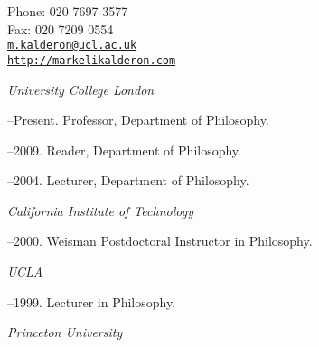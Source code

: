 \documentclass[11pt]{article}
\makeatletter
\def\myemail{m.kalderon@ucl.ac.uk}
\def\myweb{http://markelikalderon.com}
\def\myphone{020 7697 3577}
\def\myfax{020 7209 0554}
\makeatother
\begin{document}
\begin{minipage}[t]{2.95in}
  
\end{minipage}
\hfill     
\hfill
\begin{minipage}[t]{1.7in}
  \flushright \footnotesize Phone: \myphone \\ 
  Fax: \myfax  \\ 
  {\scriptsize  \texttt{\href{mailto:\myemail}{\myemail}}} \\
  {\scriptsize  \texttt{\href{\myweb}{\myweb}}}
\end{minipage}


\medskip

\reversemarginpar

\medskip       

\medskip
{}

\noindent\emph{University College London \vspace{0.01in}}

--Present. Professor, Department of Philosophy.      

--2009. Reader, Department of Philosophy.

--2004. Lecturer, Department of Philosophy.

\medskip
\noindent\emph{California Institute of Technology \vspace{0.01in}}

--2000. Weisman Postdoctoral Instructor in Philosophy.

\medskip
\noindent\emph{UCLA \vspace{0.01in}}

--1999. Lecturer in Philosophy.

\medskip
\noindent\emph{Princeton University \vspace{0.01in}}
\end{document}
